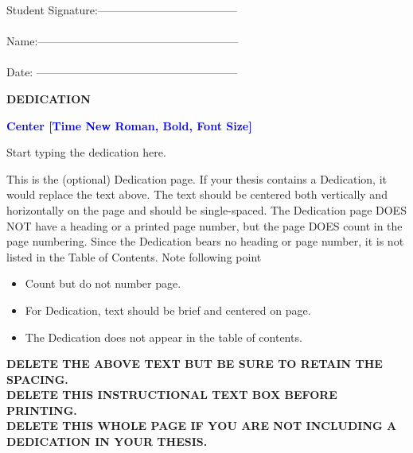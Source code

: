 \documentclass{article}
\begin{document}
\begin{flushright}
Student Signature:--------------------------------------\\~\\
Name:------------------------------------------------------ \\~\\					
Date: ------------------------------------------------------ \\			\end{flushright}
\NoBgThispage  
  \newpage
	\thispagestyle{empty}
\begin{center}
\textbf {DEDICATION}
\end{center}
\begin{center}
   {\small
   \bfseries \textcolor{blue}{Center [Time New Roman, Bold, Font Size]}
}\\

\end{center}
Start typing the dedication here.
\vspace{2cm}



\begin{tcolorbox}[enhanced jigsaw,
    sharp corners,
    boxrule=0.5pt, 
    colback=blue!30!white,   
    borderline={0.5pt}{-2pt}{black,solid} %
 ]
 \begin{justify}
This is the (optional) Dedication page. If your thesis contains a Dedication, it would replace the text above. The text should be centered both vertically and horizontally on the page and should be single-spaced. The Dedication page DOES NOT have a heading or a printed page number, but the page DOES count in the page numbering. Since the Dedication bears no heading or page number, it is not listed in the Table of Contents.
Note following point
\begin{itemize}
    

\item Count but do not number page.
\item For Dedication, text should be brief and centered on page.
\item The Dedication does not appear in the table of contents.
\end{itemize}
\bf {DELETE THE ABOVE TEXT BUT BE SURE TO RETAIN THE SPACING.\\
DELETE THIS INSTRUCTIONAL TEXT BOX BEFORE PRINTING.\\
DELETE THIS WHOLE PAGE IF YOU ARE NOT INCLUDING A DEDICATION IN YOUR THESIS.}
\end{justify}
\end{tcolorbox}
\end{document}
